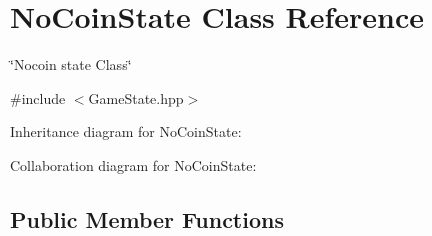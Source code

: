 \hypertarget{classNoCoinState}{}\section{No\+Coin\+State Class Reference}
\label{classNoCoinState}


\char`\"{}\+Nocoin state Class\char`\"{}  




{\ttfamily \#include $<$Game\+State.\+hpp$>$}



Inheritance diagram for No\+Coin\+State\+:


Collaboration diagram for No\+Coin\+State\+:
\subsection*{Public Member Functions}
